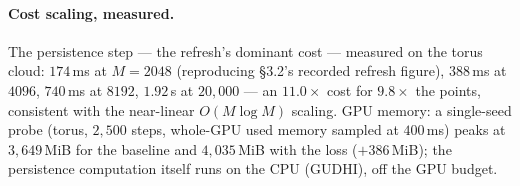 \paragraph{Cost scaling, measured.}
The persistence step --- the refresh's dominant cost --- measured on
the torus cloud: $174$\,ms at $M{=}2048$ (reproducing \S3.2's recorded
refresh figure), $388$\,ms at $4096$, $740$\,ms at $8192$, $1.92$\,s at
$20{,}000$ --- an $11.0\times$ cost for $9.8\times$ the points,
consistent with the near-linear $O(M\log M)$ scaling.
GPU memory: a single-seed probe (torus, $2{,}500$ steps, whole-GPU used
memory sampled at $400$\,ms) peaks at $3{,}649$\,MiB for the baseline
and $4{,}035$\,MiB with the loss ($+386$\,MiB); the persistence
computation itself runs on the CPU (GUDHI), off the GPU budget.
